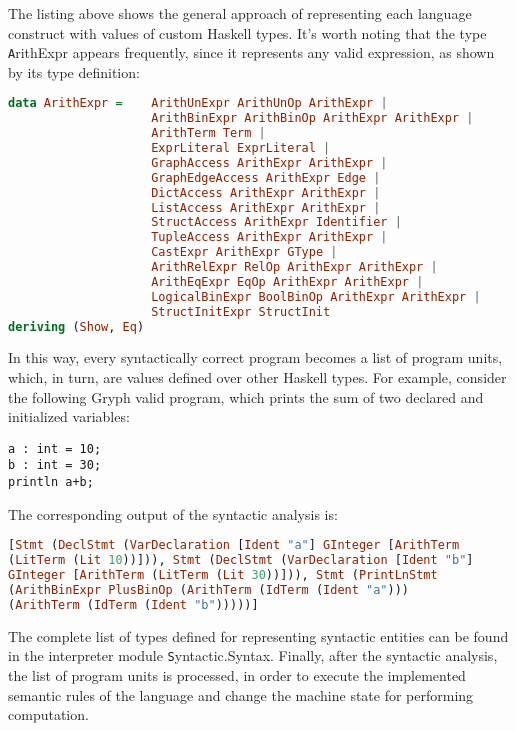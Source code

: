 The listing above shows the general approach of representing each
language construct with values of custom Haskell types.
It's worth noting that the type {\texttt ArithExpr}
appears frequently, since it represents any valid expression, as 
shown by its type definition:

\begin{lstlisting}[language=Haskell,basicstyle=\footnotesize]
data ArithExpr =    ArithUnExpr ArithUnOp ArithExpr | 
                    ArithBinExpr ArithBinOp ArithExpr ArithExpr | 
                    ArithTerm Term |
                    ExprLiteral ExprLiteral |
                    GraphAccess ArithExpr ArithExpr |
                    GraphEdgeAccess ArithExpr Edge |
                    DictAccess ArithExpr ArithExpr |
                    ListAccess ArithExpr ArithExpr |
                    StructAccess ArithExpr Identifier |
                    TupleAccess ArithExpr ArithExpr |
                    CastExpr ArithExpr GType |
                    ArithRelExpr RelOp ArithExpr ArithExpr |
                    ArithEqExpr EqOp ArithExpr ArithExpr |
                    LogicalBinExpr BoolBinOp ArithExpr ArithExpr |
                    StructInitExpr StructInit
deriving (Show, Eq)
\end{lstlisting}

In this way, every syntactically correct program becomes a list
of program units, which, in turn, are values defined over other
Haskell types. For example, consider the following Gryph valid program,
which prints the sum of two declared and initialized variables:

\begin{lstlisting}[language=Gryph]
a : int = 10;
b : int = 30;
println a+b;
\end{lstlisting}

The corresponding output of the syntactic analysis is:

\begin{lstlisting}[language=Haskell,basicstyle=\scriptsize]
[Stmt (DeclStmt (VarDeclaration [Ident "a"] GInteger [ArithTerm 
(LitTerm (Lit 10))])), Stmt (DeclStmt (VarDeclaration [Ident "b"] 
GInteger [ArithTerm (LitTerm (Lit 30))])), Stmt (PrintLnStmt 
(ArithBinExpr PlusBinOp (ArithTerm (IdTerm (Ident "a"))) 
(ArithTerm (IdTerm (Ident "b")))))]
\end{lstlisting}

The complete list of types defined for representing syntactic
entities can be found in the interpreter module {\texttt Syntactic.Syntax}. 
Finally, after the syntactic analysis, the list of program units
is processed, in order to execute the implemented semantic rules
of the language and change the machine state for performing
computation. 

